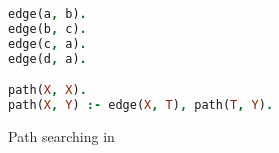 \begin{figure}[h!]
  \begin{lstlisting}[language=prolog, basicstyle=\small]
edge(a, b). 
edge(b, c). 
edge(c, a). 
edge(d, a). 

path(X, X). 
path(X, Y) :- edge(X, T), path(T, Y). 
  \end{lstlisting}
  \caption{Path searching in \prolog}
  \label{fig:background:graph}
\end{figure}